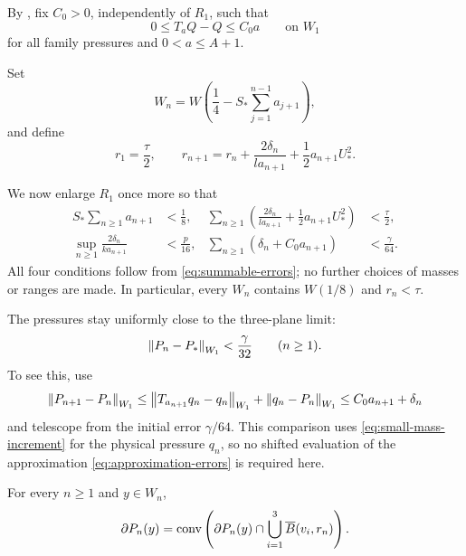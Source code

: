By , fix \(C_0>0\), independently of
\(R_1\), such that
\begin{equation}\label{eq:small-mass-increment}
 0\le T_aQ-Q\le C_0a\qquad\text{on }W_1
\end{equation}
for all family pressures and \(0<a\le A+1\).

Set
\[
 W_n=W\left(\frac14-S_*\sum_{j=1}^{n-1}a_{j+1}\right),
\]
and define
\begin{equation}\label{eq:slope-radii}
 r_1=\frac{\tau}{2},\qquad
 r_{n+1}=r_n+\frac{2\delta_n}{la_{n+1}}
                   +\frac12a_{n+1}U_*^2.
\end{equation}

We now enlarge \(R_1\) once more so that
\begin{align}
 S_*\sum_{n\ge1}a_{n+1}&<\frac18,
 &\sum_{n\ge1}\left(\frac{2\delta_n}{la_{n+1}}
                         +\frac12a_{n+1}U_*^2\right)&<\frac{\tau}{2},
 \label{eq:domain-radius-budget}\\
 \sup_{n\ge1}\frac{2\delta_n}{ka_{n+1}}&<\frac p{16},
 &\sum_{n\ge1}(\delta_n+C_0a_{n+1})&<\frac{\gamma}{64}.
 \label{eq:band-pressure-budget}
\end{align}
All four conditions follow from \eqref{eq:summable-errors};
no further choices of masses or ranges are made.
In particular, every \(W_n\) contains \(W(1/8)\) and \(r_n<\tau\).

The pressures stay uniformly close to the three-plane limit:
\begin{equation}\label{eq:pressure-near-limit}
 \left\lVert P_n-P_*\right\rVert_{W_1}<\frac{\gamma}{32}\qquad(n\ge1).
\end{equation}
To see this, use
\[
 \left\lVert P_{n+1}-P_n\right\rVert_{W_1}
 \le \left\lVert T_{a_{n+1}}q_n-q_n\right\rVert_{W_1}
          +\left\lVert q_n-P_n\right\rVert_{W_1}
 \le C_0a_{n+1}+\delta_n
\]
and telescope from the initial error \(\gamma/64\).
This comparison uses \eqref{eq:small-mass-increment} for the physical
pressure \(q_n\), so no shifted evaluation of the approximation
\eqref{eq:approximation-errors} is required here.

\begin{proposition}\label{m:propagation}
For every \(n\ge1\) and \(y\in W_n\),
\begin{equation}\label{eq:separated-generators}
 \partial P_n(y)=
 \operatorname{conv}\left(\partial P_n(y)\cap
                 \bigcup_{i=1}^3\overline B(v_i,r_n)\right).
\end{equation}
\end{proposition}

